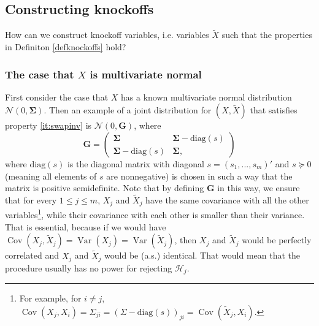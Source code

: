 \documentclass[11pt]{article}
\theoremstyle{plain}
\theoremstyle{definition}
\newcommand{\N}{\mathcal{N}}
\newcommand{\Hy}{\mathcal{H}}
\newcommand{\Sigm}{\mathbf{\Sigma}}
\DeclareMathOperator{\Var}{Var}
\DeclareMathOperator{\Cov}{Cov}
\begin{document}
 \subsection{Constructing knockoffs} \label{secconknock}
 How can we construct knockoff variables, i.e. variables $\tilde{X}$ such that the properties in Definiton \ref{defknockoffs} hold?
 
 \subsubsection{The case that $X$ is multivariate normal} \label{secXmvn}
First consider the case  that $X$ has a known multivariate normal distribution $\N(0,\Sigm)$. Then an example of a  joint distribution for $(X, \tilde{X})$ that satisfies property \eqref{it:swapinv} is 
$\N(0,\mathbf{G})$,
where 
\begin{equation} \label{refG}
\mathbf{G}  = 
\begin{pmatrix}
\Sigm & \Sigm -\text{diag}(s) \\
\Sigm -\text{diag}(s) & \Sigm,
\end{pmatrix}
\end{equation}
  where $\text{diag}(s)$ is the diagonal matrix with diagonal $s=(s_1,...,s_m)'$ and $s\succeq 0$ (meaning all elements of $s$ are nonnegative) is chosen in such a way that the matrix is positive semidefinite. Note that by defining $\mathbf{G}$ in this way, we ensure that for every $1\leq j \leq m$, $X_j$ and $\tilde{X}_j$ have the same covariance with all the other variables\footnote{For example, for $i\neq j$, $\Cov(X_j,X_i)=\Sigma_{ji}=(\Sigma-\text{diag}(s))_{ji} = \Cov(\tilde{X}_j,X_i)$.}, while  their covariance with each other is smaller than their variance. That is essential, because if we would have $\Cov(X_j,\tilde{X}_j) = \Var(X_j)=\Var(\tilde{X}_j)$, then $X_j$ and $\tilde{X}_j$ would be perfectly correlated and  $X_j$ and $\tilde{X}_j$ would be (a.s.) identical. That would mean that the procedure usually has no power for rejecting $\Hy_j$.
  
\end{document}
